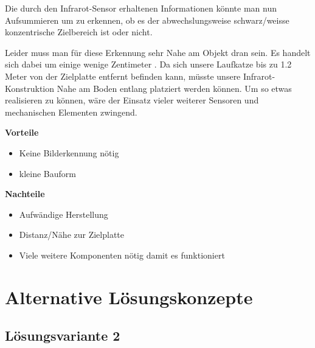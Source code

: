 \documentclass[a4paper]{report}
\begin{document}
Die durch den Infrarot-Sensor erhaltenen Informationen könnte man nun Aufsummieren um zu erkennen, ob es der abwechslungsweise schwarz/weisse konzentrische Zielbereich ist oder nicht.

Leider muss man für diese Erkennung sehr Nahe am Objekt dran sein. Es handelt sich dabei um einige wenige Zentimeter \parencite{Aswinth2017}. Da sich unsere Laufkatze bis zu 1.2 Meter von der Zielplatte entfernt befinden kann, müsste unsere Infrarot-Konstruktion Nahe am Boden entlang platziert werden können. Um so etwas realisieren zu können, wäre der Einsatz vieler weiterer Sensoren und mechanischen Elementen zwingend.

\begin{multicols}{2}
	\textbf{Vorteile}
	\begin{itemize}[label={+},noitemsep]
		\item Keine Bilderkennung nötig
		\item kleine Bauform
	\end{itemize}
	\columnbreak
	\textbf{Nachteile}
	\begin{itemize}[label={-},noitemsep]
		\item Aufwändige Herstellung
		\item Distanz/Nähe zur Zielplatte
		\item Viele weitere Komponenten nötig damit es funktioniert
	\end{itemize}
\end{multicols}

\chapter{Alternative Lösungskonzepte}
\label{app:ch:AltLoesung}
\section{Lösungsvariante 2}
\label{app:sec:Lvar2}
\end{document}
